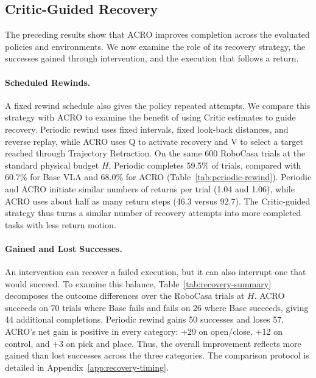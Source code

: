 \subsection{Critic-Guided Recovery}
\label{sec:analysis}
The preceding results show that ACRO improves completion across the evaluated policies and environments. We now examine the role of its recovery strategy, the successes gained through intervention, and the execution that follows a return.


\paragraph{Scheduled Rewinds.}
A fixed rewind schedule also gives the policy repeated attempts. We compare this strategy with ACRO to examine the benefit of using Critic estimates to guide recovery. Periodic rewind uses fixed intervals, fixed look-back distances, and reverse replay, while ACRO uses Q to activate recovery and V to select a target reached through Trajectory Retraction. On the same 600 RoboCasa trials at the standard physical budget $H$, Periodic completes 59.5\% of trials, compared with 60.7\% for Base VLA and 68.0\% for ACRO (Table~\ref{tab:periodic-rewind}). Periodic and ACRO initiate similar numbers of returns per trial (1.04 and 1.06), while ACRO uses about half as many return steps (46.3 versus 92.7). The Critic-guided strategy thus turns a similar number of recovery attempts into more completed tasks with less return motion.
\finishwrap


\paragraph{Gained and Lost Successes.}
An intervention can recover a failed execution, but it can also interrupt one that would succeed. To examine this balance, Table~\ref{tab:recovery-summary} decomposes the outcome differences over the RoboCasa trials at $H$. ACRO succeeds on 70 trials where Base fails and fails on 26 where Base succeeds, giving 44 additional completions. Periodic rewind gains 50 successes and loses 57. ACRO's net gain is positive in every category: +29 on open/close, +12 on control, and +3 on pick and place. Thus, the overall improvement reflects more gained than lost successes across the three categories. The comparison protocol is detailed in Appendix~\ref{app:recovery-timing}.
\finishwrap

